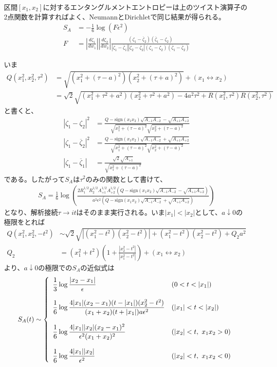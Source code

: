 区間$[x_1,x_2]$に対するエンタングルメントエントロピーは上のツイスト演算子の2点関数を計算すればよく、NeumannとDirichletで同じ結果が得られる。
\begin{align}
S_A&=-\frac{1}{6}\log (F\epsilon^2)\\
F&=\left|\frac{d\zeta_1}{dw_1}\right|\left|\frac{d\zeta_2}{dw_2}\right|
\frac{(\zeta_1-\overline{\zeta}_2)(\overline{\zeta}_1-\zeta_2)}{|\zeta_1-\overline{\zeta}_1||\zeta_2-\overline{\zeta}_2|(\zeta_1-\zeta_2)(\overline{\zeta}_1-\overline{\zeta}_2)}
\end{align}

いま
\begin{align}
Q(x_1^2,x_2^2,\tau^2)&= \sqrt{(x_1^2+(\tau-a)^2)(x_2^2+(\tau+a)^2)}+(x_1\leftrightarrow x_2)\\
&=\sqrt{2}\sqrt{(x_1^2+\tau^2+a^2)(x_2^2+\tau^2+a^2)-4a^2\tau^2+R(x_1^2,\tau^2)R(x_2^2,\tau^2)}
\end{align}
と書くと、
\begin{align}
|\zeta_1-\zeta_2|^2&=\frac{ Q-\text{sign}(x_1x_2)\sqrt{A_{-1}A_{-2}}-\sqrt{A_{+1}A_{+2}} }{\sqrt{x_1^2+(\tau-a)^2}\sqrt{x_2^2+(\tau-a)^2}}\\
|\zeta_1-\overline{\zeta}_2|^2&=\frac{ Q-\text{sign}(x_1x_2)\sqrt{A_{-1}A_{-2}}+\sqrt{A_{+1}A_{+2}} }{\sqrt{x_1^2+(\tau-a)^2}\sqrt{x_2^2+(\tau-a)^2}}\\
|\zeta_1-\overline{\zeta}_1|&=\frac{\sqrt{2}\sqrt{A_{+1}}}{\sqrt{x_1^2+(\tau-a)^2}}
\end{align}
である。したがって$S_A$は$\tau^2$のみの関数として書けて、
\begin{align}
S_A=\frac{1}{6}\log \left( \frac{2R_1^{1/2}R_2^{1/2}A_{+1}^{1/2}A_{+2}^{1/2}(Q-\text{sign}(x_1x_2)\sqrt{A_{-1}A_{-2}}-\sqrt{A_{+1}A_{+2}})}{a^2\epsilon^2(Q-\text{sign}(x_1x_2)\sqrt{A_{-1}A_{-2}}+\sqrt{A_{+1}A_{+2}})} \right)
\end{align}
となり、解析接続$\tau\to it$はそのまま実行される。いま$|x_1|<|x_2|$として、$a\downarrow 0$の極限をとれば
\begin{align}
Q(x_1^2,x_2^2,-t^2)&\sim \sqrt{2}\sqrt{|(x_1^2-t^2)(x_2^2-t^2)|+(x_1^2-t^2)(x_2^2-t^2)+Q_2 a^2}\\
Q_2&=(x_1^2+t^2)\left(1+\frac{|x_2^2-t^2|}{|x_1^2-t^2|}\right)+(x_1\leftrightarrow x_2)
\end{align}
より、$a\downarrow 0$の極限での$S_A$の近似式は
\begin{align}
S_A(t)\sim \left\{ \begin{array}{ll}
\bigskip\dfrac{1}{3}\log\dfrac{|x_2-x_1|}{\epsilon}  &(0<t<|x_1|)\\
\bigskip\dfrac{1}{6}\log \dfrac{4|x_1|(x_2-x_1)(t-|x_1|)(x_2^2-t^2)}{(x_1+x_2)(t+|x_1|)a\epsilon^2} &(|x_1|<t<|x_2|)\\
\bigskip\dfrac{1}{6}\log \dfrac{4|x_1||x_2|(x_2-x_1)^2}{\epsilon^2(x_1+x_2)^2}  &(|x_2|<t,\ x_1x_2>0 )\\
\dfrac{1}{6}\log\dfrac{4|x_1||x_2|}{\epsilon^2} &(|x_2|<t,\ x_1x_2<0 )
\end{array}\right.
\end{align}
